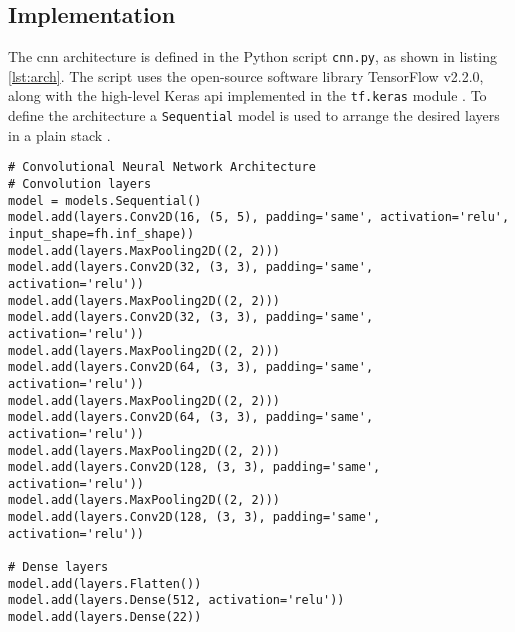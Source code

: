 \subsection{Implementation}
\label{subsec:training_of_the_cnn:architecture:implementation}
The \acrshort{cnn} architecture is defined in the Python script \texttt{cnn.py}, as shown in listing \ref{lst:arch}.
The script uses the open-source software library TensorFlow v2.2.0, along with the high-level Keras \acrshort{api} implemented in the \texttt{tf.keras} module \cite{training_arch_tf_keras}.
To define the architecture a \texttt{Sequential} model is used to arrange the desired layers in a plain stack \cite{training_arch_tf_keras_seq}.

\begin{lstlisting}[style=python, caption={Sequential model}, label=lst:arch]
# Convolutional Neural Network Architecture
# Convolution layers
model = models.Sequential()
model.add(layers.Conv2D(16, (5, 5), padding='same', activation='relu', input_shape=fh.inf_shape))
model.add(layers.MaxPooling2D((2, 2)))
model.add(layers.Conv2D(32, (3, 3), padding='same', activation='relu'))
model.add(layers.MaxPooling2D((2, 2)))
model.add(layers.Conv2D(32, (3, 3), padding='same', activation='relu'))
model.add(layers.MaxPooling2D((2, 2)))
model.add(layers.Conv2D(64, (3, 3), padding='same', activation='relu'))
model.add(layers.MaxPooling2D((2, 2)))
model.add(layers.Conv2D(64, (3, 3), padding='same', activation='relu'))
model.add(layers.MaxPooling2D((2, 2)))
model.add(layers.Conv2D(128, (3, 3), padding='same', activation='relu'))
model.add(layers.MaxPooling2D((2, 2)))
model.add(layers.Conv2D(128, (3, 3), padding='same', activation='relu'))

# Dense layers
model.add(layers.Flatten())
model.add(layers.Dense(512, activation='relu'))
model.add(layers.Dense(22))
\end{lstlisting}
